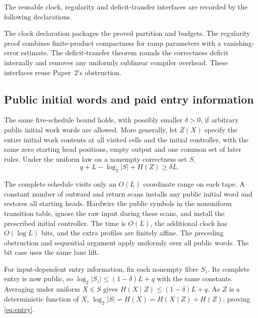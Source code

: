 The reusable clock, regularity and deficit-transfer interfaces are recorded
by the following declarations.
\begin{outline}
The clock declaration packages the proved partition and budgets. The
regularity proof combines finite-product compactness for ramp parameters
with a vanishing-error estimate. The deficit-transfer theorem rounds
the correctness deficit internally and removes any uniformly sublinear
compiler overhead. These interfaces reuse Paper~2's obstruction.
\end{outline}

\subsection{Public initial words and paid entry information}

\begin{proposition}
\label{prop:entry}
The same five-schedule bound holds, with possibly smaller $\delta>0$,
if arbitrary public initial work words are allowed. More generally, let
$Z(X)$ specify the entire initial work contents at all visited cells and
the initial controller, with the same zero starting head positions, empty output and one
common set of later rules. Under the uniform law on a nonempty correctness
set $S$,
\begin{equation}
\label{eq:entry}
                 q+L-\log_2|S|+H(Z)\ge\delta L.
\end{equation}
\end{proposition}
\notformalized
\begin{informalproof}
The complete schedule visits only an $O(L)$ coordinate range on each
tape. A constant number of outward and return scans installs any public
initial word and restores all starting heads. Hardwire the public symbols
in the nonuniform transition table, ignore the raw input during these
scans, and install the prescribed initial controller. The time is $O(L)$,
the additional clock has $O(\log L)$ bits, and the extra profiles are
finitely affine. The preceding obstruction and sequential argument apply
uniformly over all public words. The bit case uses the same lane lift.

For input-dependent entry information, fix each nonempty fibre $S_z$.
Its complete entry is now public, so
$\log_2|S_z|\le(1-\delta)L+q$ with the same constants. Averaging under
uniform $X\in S$ gives $H(X\mid Z)\le(1-\delta)L+q$.
As $Z$ is a deterministic function of $X$,
$\log_2|S|=H(X)=H(X\mid Z)+H(Z)$, proving \eqref{eq:entry}.
\end{informalproof}

